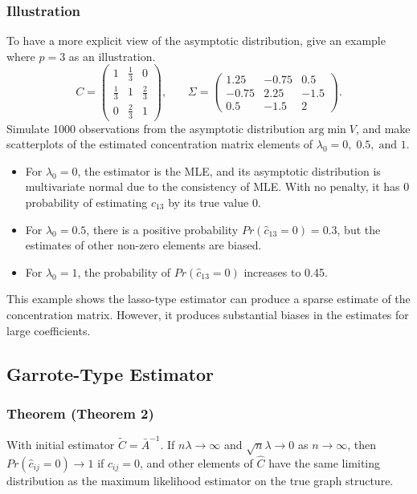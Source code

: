 \documentclass[11pt]{article} %
\begin{document}
\subsubsection{Illustration}
To have a more explicit view of the asymptotic distribution, give an example where $p=3$ as an illustration. 
\[C=\left( \begin{array}{ccc}
1 & \frac{1}{3} & 0 \\
\frac{1}{3} & 1 & \frac{2}{3} \\
0 & \frac{2}{3} & 1 \end{array} \right) \mbox{,}\qquad
\Sigma=\left( \begin{array}{ccc}
1.25 & -0.75 & 0.5 \\
-0.75 & 2.25 & -1.5 \\
0.5 & -1.5 & 2
\end{array} \right) \mbox{.}
\]
Simulate 1000 observations from the asymptotic distribution $\mbox{arg} \min V$, and make scatterplots of the estimated concentration matrix elements of $\lambda_0=0,\; 0.5,\; \mbox{and }1$. 
\begin{itemize}
\item For $\lambda_0=0$, the estimator is the MLE, and its asymptotic distribution is multivariate normal due to the consistency of MLE. With no penalty, it has 0 probability of estimating $c_{13}$ by its true value 0. 
\item For $\lambda_0=0.5$, there is a positive probability $Pr(\hat{c}_{13}=0)=0.3$, but the estimates of other non-zero elements are biased. 
\item For $\lambda_0=1$, the probability of $Pr(\hat{c}_{13}=0)$ increases to 0.45.
\end{itemize}

This example shows the lasso-type estimator can produce a sparse estimate of the concentration matrix. However, it produces substantial biases in the estimates for large coefficients. 

\subsection{Garrote-Type Estimator}
\subsubsection{Theorem (Theorem 2)}
With initial estimator $\tilde{C}=\bar{A}^{-1}$. If $n\lambda \rightarrow \infty$ and $\sqrt{n} \lambda \rightarrow 0$ as $n\rightarrow \infty$, then $Pr(\hat{c}_{ij}=0)\rightarrow 1$ if $c_{ij}=0$, and other elements of $\hat{C}$ have the same limiting distribution as the maximum likelihood estimator on the true graph structure. \\
\end{document}
